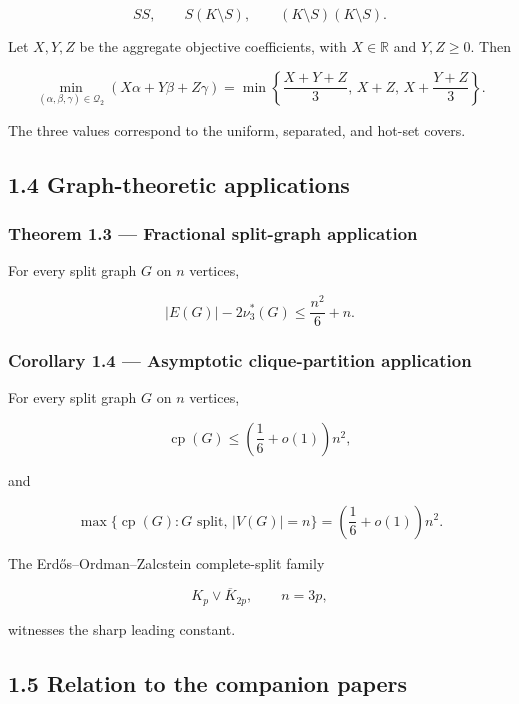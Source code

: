 \documentclass[11pt,a4paper]{article}
\begin{document}
\[
SS,\qquad S(K\setminus S),\qquad (K\setminus S)(K\setminus S).
\]

Let \(X,Y,Z\) be the aggregate objective coefficients, with \(X\in\mathbb R\) and \(Y,Z\ge0\). Then

\[
\boxed{
\min_{(\alpha,\beta,\gamma)\in\mathcal Q_2}
(X\alpha+Y\beta+Z\gamma)
=
\min\left\{
\frac{X+Y+Z}{3},\,
X+Z,\,
X+\frac{Y+Z}{3}
\right\}.
}
\tag{1.5}
\]

The three values correspond to the uniform, separated, and hot-set covers.

\subsection{1.4 Graph-theoretic applications}\label{graph-theoretic-applications}

\subsubsection{Theorem 1.3 --- Fractional split-graph application}\label{theorem-1.3-fractional-split-graph-application}

For every split graph \(G\) on \(n\) vertices,

\[
\boxed{
|E(G)|-2\nu_3^*(G)
\le
\frac{n^2}{6}+n.
}
\tag{1.6}
\]

\subsubsection{Corollary 1.4 --- Asymptotic clique-partition application}\label{corollary-1.4-asymptotic-clique-partition-application}

For every split graph \(G\) on \(n\) vertices,

\[
\operatorname{cp}(G)
\le
\left(\frac16+o(1)\right)n^2,
\tag{1.7}
\]

and

\[
\max\{\operatorname{cp}(G):G\text{ split},\,|V(G)|=n\}
=
\left(\frac16+o(1)\right)n^2.
\tag{1.8}
\]

The Erdős--Ordman--Zalcstein complete-split family

\[
K_p\vee\overline K_{2p},
\qquad n=3p,
\]

witnesses the sharp leading constant.

\subsection{1.5 Relation to the companion papers}\label{relation-to-the-companion-papers}
\end{document}
